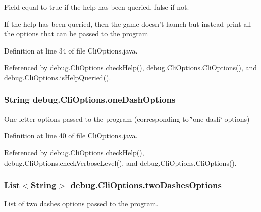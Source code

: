 Field equal to true if the help has been queried, false if not. 

If the help has been queried, then the game doesn't launch but instead print all the options that can be passed to the program 

Definition at line 34 of file Cli\-Options.\-java.



Referenced by debug.\-Cli\-Options.\-check\-Help(), debug.\-Cli\-Options.\-Cli\-Options(), and debug.\-Cli\-Options.\-is\-Help\-Queried().

\hypertarget{a00006_af118f8dc0f511ad69a7d3889d207a6f3}{
\subsubsection[{one\-Dash\-Options}]{\setlength{\rightskip}{0pt plus 5cm}String debug.\-Cli\-Options.\-one\-Dash\-Options\hspace{0.3cm}{\ttfamily [protected]}}}\label{a00006_af118f8dc0f511ad69a7d3889d207a6f3}


One letter options passed to the program (corresponding to \char`\"{}one dash\char`\"{} options) 



Definition at line 40 of file Cli\-Options.\-java.



Referenced by debug.\-Cli\-Options.\-check\-Help(), debug.\-Cli\-Options.\-check\-Verbose\-Level(), and debug.\-Cli\-Options.\-Cli\-Options().

\hypertarget{a00006_af52ecd6d0cb0cafd69f80f311e7d77d4}{
\subsubsection[{two\-Dashes\-Options}]{\setlength{\rightskip}{0pt plus 5cm}List$<$String$>$ debug.\-Cli\-Options.\-two\-Dashes\-Options\hspace{0.3cm}{\ttfamily [protected]}}}\label{a00006_af52ecd6d0cb0cafd69f80f311e7d77d4}


List of two dashes options passed to the program. 



